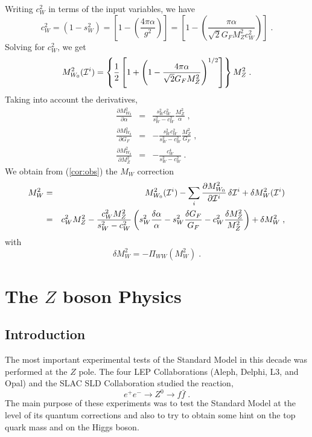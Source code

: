 \documentclass[12pt]{report}
\newcommand{\del}{\partial}
\begin{document}
Writing $c_W^2$ in terms of the input variables, we have
\[
{ c_W^2} = (1 - s_W^2)  = 
\left[1 - \left(\frac{4 \pi \alpha}{g^2}\right) \right] =
\left[1 - 
\left(\frac{\pi \alpha}{\sqrt{2} G_F M_Z^2 { c_W^2}}\right) \right] \; .
\]
Solving for $c_W^2$, we get
\[
M_{W_0}^2 ({\cal I}^i) = \left\{ \frac{1}{2} \left[ 1 + 
\left(1 - \frac{4 \pi \alpha}{\sqrt{2} G_F M_Z^2} \right)^{1/2} \right]
\right\} M_Z^2 \; .
\]
Taking into account the derivatives,
\begin{eqnarray*}
\frac{\del M_{W_0}^2}{\del \alpha} & = & \frac{s_W^2 c_W^2}{s_W^2 - c_W^2}
\frac{M_Z^2}{\alpha}  
\; , \\
\frac{\del M_{W_0}^2}{\del G_F} & = & - \frac{s_W^2 c_W^2}{s_W^2 - c_W^2} 
\frac{M_Z^2}{G_F} 
\; , \\
\frac{\del M_{W_0}^2}{\del M_Z^2} & = & - \frac{c_W^4}{s_W^2 - c_W^2}
\; .
\end{eqnarray*}
We obtain from (\ref{cor:obs}) the $M_W$ correction
\begin{eqnarray*}
M_W^2 &=& M_{W_0}^2 ({\cal I}^i)  - 
\sum_i \frac{\del M_{W_0}^2}{\del {\cal I}^i} \, \delta {\cal I}^i 
+ \delta M_{W}^2 ({\cal I}^i) \\
&=& c_W^2 M_{Z}^2  - \frac{c_W^2 M_Z^2}{s_W^2 - c_W^2}
\left(s_W^2 \frac{\delta \alpha}{\alpha} 
-  s_W^2 \frac{\delta G_F}{G_F}  
- c_W^2 \frac{\delta M_Z^2}{M_Z^2} \right) + \delta M_W^2 \; ,
\end{eqnarray*}
with
\[
\delta M_W^2 = - \Pi_{WW} (M_W^2) \; .
\]



\section{The $Z$ boson Physics} \label{z:phy} 

\subsection{Introduction} \indent

The most important experimental tests of the Standard Model in this
decade was performed at the $Z$ pole. The four LEP
Collaborations (Aleph, Delphi, L3, and Opal)\cite{Lep:99} and the
SLAC SLD Collaboration \cite{Sld:97} studied the reaction,
\[
e^+ e^- \to Z^0 \to f \bar{f} \; .
\]
The main purpose of these experiments was to test the Standard Model
at the level of its quantum corrections and also to try to obtain
some hint on the top quark mass and on the Higgs boson. 
\end{document}
